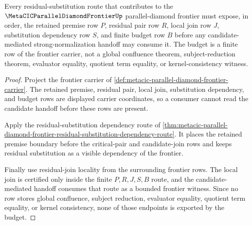 \begin{theorem}
\label{thm:metacic-parallel-diamond-frontier-residual-substitution-confluence-budget}
Every residual-substitution route that contributes to the $\MetaCICParallelDiamondFrontierUp$ parallel-diamond frontier must expose, in order, the retained premise row $P$, residual pair row $R$, local join row $J$, substitution dependency row $S$, and finite budget row $B$ before any candidate-mediated strong-normalization handoff may consume it. The budget is a finite row of the frontier carrier, not a global confluence theorem, subject-reduction theorem, evaluator equality, quotient term equality, or kernel-consistency witness.
\end{theorem}
\begin{proof}
Project the frontier carrier of \autoref{def:metacic-parallel-diamond-frontier-carrier}. The retained premise, residual pair, local join, substitution dependency, and budget rows are displayed carrier coordinates, so a consumer cannot read the candidate handoff before these rows are present.

Apply the residual-substitution dependency route of \autoref{thm:metacic-parallel-diamond-frontier-residual-substitution-dependency-route}. It places the retained premise boundary before the critical-pair and candidate-join rows and keeps residual substitution as a visible dependency of the frontier.

Finally use residual-join locality from the surrounding frontier rows. The local join is certified only inside the finite $P,R,J,S,B$ route, and the candidate-mediated handoff consumes that route as a bounded frontier witness. Since no row stores global confluence, subject reduction, evaluator equality, quotient term equality, or kernel consistency, none of those endpoints is exported by the budget.
\end{proof}
